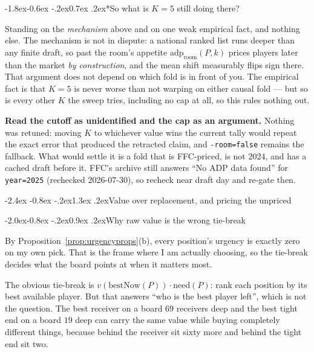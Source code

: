 \documentclass[10pt,a4paper]{article}
\makeatletter
\theoremstyle{plain}
\theoremstyle{definition}
\theoremstyle{remark}
\newcommand{\code}[1]{\texttt{\small #1}}
\newcommand{\adp}{\mathrm{adp}}
\renewcommand\section{\@startsection{section}{1}{\z@}%
  {-2.4ex \@plus -0.8ex \@minus -.2ex}{1.3ex \@plus.2ex}{\normalfont\Large\bfseries}}
\renewcommand\subsection{\@startsection{subsection}{2}{\z@}%
  {-2.0ex\@plus -0.8ex \@minus -.2ex}{0.9ex \@plus .2ex}{\normalfont\large\bfseries}}
\renewcommand\subsubsection{\@startsection{subsubsection}{3}{\z@}%
  {-1.8ex\@plus -0.6ex \@minus -.2ex}{0.7ex \@plus .2ex}{\normalfont\normalsize\bfseries}}
\makeatother
\begin{document}
\subsubsection*{So what is $K = 5$ still doing there?}

Standing on the \emph{mechanism} above and on one weak empirical fact, and nothing else.
The mechanism is not in dispute: a national ranked list runs deeper than any finite draft,
so past the room's appetite $\adp_{\text{room}}(P,k)$ prices players later than the market
\emph{by construction}, and the mean shift measurably flips sign there. That argument does
not depend on which fold is in front of you. The empirical fact is that $K = 5$ is never
worse than not warping on either causal fold --- but so is every other $K$ the sweep tries,
including no cap at all, so this rules nothing out.

\textbf{Read the cutoff as unidentified and the cap as an argument.} Nothing was retuned:
moving $K$ to whichever value wins the current tally would repeat the exact error that
produced the retracted claim, and \code{-room=false} remains the fallback. What would settle
it is a fold that is FFC-priced, is not 2024, and has a cached draft before it. FFC's
archive still answers ``No ADP data found'' for \code{year=2025} (rechecked 2026-07-30), so
recheck near draft day and re-gate then.

\section{Value over replacement, and pricing the unpriced}
\label{sec:vor}

\subsection{Why raw value is the wrong tie-break}

By Proposition~\ref{prop:urgencyprops}(b), every position's urgency is exactly zero on my
own pick. That is the frame where I am actually choosing, so the tie-break decides what
the board points at when it matters most.

The obvious tie-break is $v(\mathrm{bestNow}(P)) \cdot \mathrm{need}(P)$: rank each
position by its best available player. But that answers ``who is the best player left'',
which is not the question. The best receiver on a board $69$ receivers deep and the best
tight end on a board $19$ deep can carry the same value while buying completely different
things, because behind the receiver sit sixty more and behind the tight end sit two.
\end{document}
